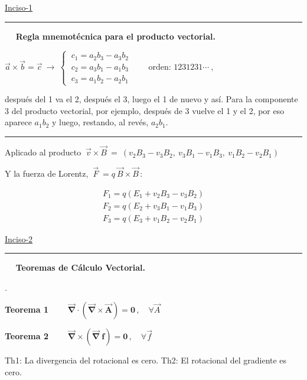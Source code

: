 \vspace{10mm}
\ul{Inciso-1} $\quad$ \rule{100pt}{0.1pt} $\quad$ \textbf{Regla mnemotécnica para el producto vectorial.}

$\vec a\times \vec b=\vec c \ \to \ 
\begin{cases}
\ c_1=a_2b_3-a_3b_2 \\ \  c_2=a_3b_1-a_1b_3 \\  \ c_3=a_1b_2-a_2b_1 	
\end{cases} \qquad \text{orden: } 1231231\cdots \ ,\ $ 

después del 1 va el 2, después el 3, luego el 1 de nuevo y así. Para la componente 3 del producto vectorial, por ejemplo, después de 3 vuelve el 1 y el 2, por eso aparece $a_1b_2$ y luego, restando, al revés, $a_2b_1$.

\vspace{-5mm}

\begin{flushright}
\rule{300pt}{0.1pt}	
\end{flushright}



Aplicado al producto $\ \vec v \times \overrightarrow B \ = \ 
(v_2B_3-v_3B_2,\ v_3B_1-v_1B_3,\ v_1B_2-v_2B_1)$

Y la fuerza de Lorentz, $\ \overrightarrow F \ = q\ \vec B \times \overrightarrow B \, $:

\begin{equation}
\label{T7Lorentz}
\begin{split}
F_1 = q(E_1+v_2B_3-v_3B_2)	\\
F_2 = q(E_2+v_3B_1-v_1B_3)	\\
F_3 = q(E_3+ v_1B_2-v_2B_1)
\end{split}	
\end{equation}

\vspace{5mm}%
\ul{Inciso-2} $\quad$ \rule{150pt}{0.1pt} $\quad$ \textbf{Teoremas de Cálculo Vectorial.}

\begin{theorem}
.	\vspace{2mm}

	\textbf{Teorema 1} \hspace{2cm} $\qquad \boldsymbol{ \overrightarrow \nabla \cdot (\overrightarrow \nabla \times \overrightarrow A) = 0 } \, ,\quad \forall \overrightarrow A$ 
	
	\vspace{2mm} \textbf{Teorema 2} \hspace{2cm} $\qquad \boldsymbol{ \overrightarrow \nabla \times (\overrightarrow \nabla \ f) = 0 } \, ,\quad \forall \overrightarrow f$ 
	
	\vspace{3mm} \textcolor{gris}{Th1: La divergencia del rotacional es cero.  \hspace{1cm} Th2: El rotacional del gradiente es cero.}
	
	\vspace{2mm}
\end{theorem}

